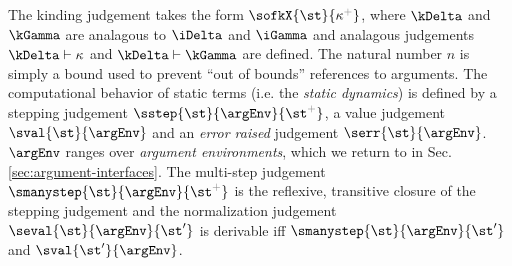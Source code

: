The kinding judgement takes the form $\sofkX{\st}{\kappa\moutput}$, where $\kDelta$ and $\kGamma$ are analagous to $\iDelta$ and $\iGamma$ and analagous judgements $\kDelta \vdash \kappa$ and $\kDelta \vdash \kGamma$ are  defined. %
The natural number $n$ is simply a bound used to prevent ``out of bounds'' references to arguments. 
The computational behavior of static terms (i.e. the \emph{static dynamics}) is defined by a stepping judgement $\sstep{\st}{\argEnv}{\st\moutput}$, a value judgement $\sval{\st}{\argEnv}$ and an \emph{error raised} judgement $\serr{\st}{\argEnv}$. $\argEnv$ ranges over \emph{argument environments}, which we  return to in Sec. \ref{sec:argument-interfaces}. The multi-step judgement $\smanystep{\st}{\argEnv}{\st\moutput}$ is the reflexive, transitive closure of the stepping judgement and the normalization judgement $\seval{\st}{\argEnv}{\st'}$ is derivable iff $\smanystep{\st}{\argEnv}{\st'}$ and $\sval{\st'}{\argEnv}$. %





